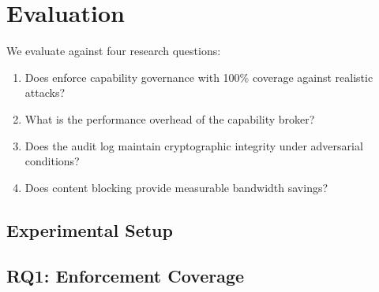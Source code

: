%

\section{Evaluation}
\label{sec:evaluation}

We evaluate \ferrite{} against four research questions:

\begin{enumerate}
  \item[\textbf{RQ1}] Does \ferrite{} enforce capability governance
    with 100\% coverage against realistic attacks?
  \item[\textbf{RQ2}] What is the performance overhead of the
    capability broker?
  \item[\textbf{RQ3}] Does the audit log maintain cryptographic
    integrity under adversarial conditions?
  \item[\textbf{RQ4}] Does content blocking provide measurable
    bandwidth savings?
\end{enumerate}

\subsection{Experimental Setup}



\subsection{RQ1: Enforcement Coverage}


